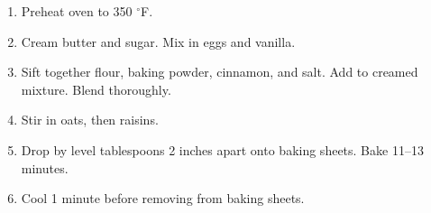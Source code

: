 
\begin{ingredients}
\end{ingredients}


\begin{recipe}
  \begin{enumerate}
  \item Preheat oven to 350 $^\circ$F.

  \item Cream butter and sugar.  Mix in eggs and vanilla.

  \item Sift together flour, baking powder, cinnamon, and salt.  Add
    to creamed mixture.  Blend thoroughly.
    
  \item Stir in oats, then raisins.

  \item Drop by level tablespoons 2 inches apart onto baking sheets.
  Bake 11--13 minutes.

\item Cool 1 minute before removing from baking sheets.

  \end{enumerate}
\end{recipe}
